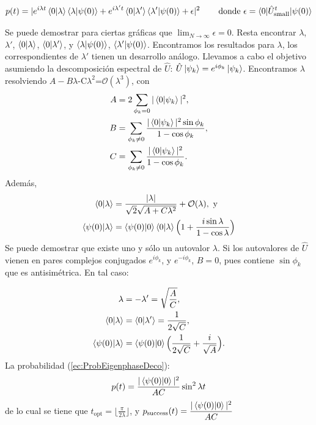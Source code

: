 \begin{equation}
    p(t)=|e^{i\lambda t}\braket{0|\lambda}\braket{\lambda|\psi(0)}+e^{i\lambda't}\braket{0|\lambda'}\braket{\lambda'|\psi(0)}+\epsilon|^2
    \label{ec:ProbEigenphaseDeco}\,\qquad\text{donde}\,\,\epsilon=\braket{0|\hat{U}^t_{\text{small}}|\psi(0)}
\end{equation}

Se puede demostrar para ciertas gráficas que $\lim_{N\xrightarrow{}\infty}\epsilon=0$. Resta encontrar $\lambda$, $\lambda'$, $\braket{0|\lambda}$, $\braket{0|\lambda'}$, y $\braket{\lambda|\psi(0)}$, $\braket{\lambda'|\psi(0)}$. Encontramos los resultados para $\lambda$, los correspondientes de $\lambda'$ tienen un desarrollo análogo. Llevamos a cabo el objetivo asumiendo la descomposición espectral de $\hat
{U}$: $\hat{U}\ket{\psi_k}=e^{i\phi_k}\ket{\psi_k}$.
Encontramos $\lambda$ resolviendo $A-B\lambda$-C$\lambda^2$=$\mathcal{O}(\lambda^3)$, con
\begin{align}
    A&=2\sum_{\phi_k=0}|\braket{0|\psi_k}|^2,\\
    B&=\sum_{\phi_k\neq0}\dfrac{|\braket{0|\psi_k}|^2\sin{\phi_k}}{1-\cos\phi_k},\\
    C&=\sum_{\phi_k\neq0}\dfrac{|\braket{0|\psi_k}|^2}{1-\cos\phi_k}.\\
\end{align}
Además,
\begin{align}
    \braket{0|\lambda}&=\dfrac{|\lambda|}{\sqrt{2}\sqrt{A+C\lambda ^2}}+\mathcal{O}(\lambda),\,\,\text{y}\\
    \braket{\psi(0)|\lambda}&=\braket{\psi(0)|0}\braket{0|\lambda}\Big(1+\frac{i\sin\lambda}{1-\cos\lambda}\Big)
\end{align}
Se puede demostrar que existe uno y sólo un autovalor $\lambda$. Si los autovalores de $\hat{U}$ vienen en pares complejos conjugados $e^{i\phi_k}$, y $e^{-i\phi_k}$, $B=0$, pues contiene $\sin\phi_k$ que es antisimétrica. En tal caso:

\begin{align}
    \lambda&=-\lambda'=\sqrt{\frac{A}{C}},\\
    \braket{0|\lambda}&=\braket{0|\lambda'}=\frac{1}{2\sqrt{C}},\\
    \braket{\psi(0)|\lambda}&=\braket{\psi(0)|0}\Big( \frac{1}{2\sqrt{C}}+\frac{i}{\sqrt{A}}\Big).
\end{align}
La probabilidad (\ref{ec:ProbEigenphaseDeco}):
\begin{equation}
    p(t)=\frac{|\braket{\psi(0)|0}|^2}{AC}\sin^2\lambda t
\end{equation}
de lo cual se tiene que $t_{\text{opt}}=\lfloor\frac{\pi}{2\lambda}\rfloor$, y $p_{\text{success}}(t)=\dfrac{|\braket{\psi(0)|0}|^2}{AC}$

